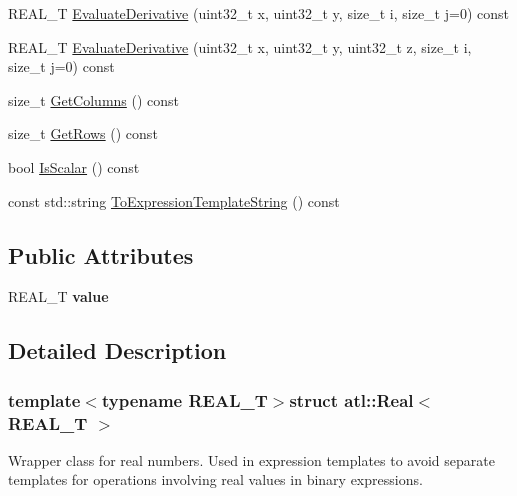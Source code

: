 \begin{DoxyCompactItemize}
\item 
R\+E\+A\+L\+\_\+\+T \hyperlink{structatl_1_1_real_a38575ddce1aa16e993c3739cef91eb85}{Evaluate\+Derivative} (uint32\+\_\+t x, uint32\+\_\+t y, size\+\_\+t i, size\+\_\+t j=0) const 
\item 
R\+E\+A\+L\+\_\+\+T \hyperlink{structatl_1_1_real_a9af356095d17f7173d85d8850159ecdc}{Evaluate\+Derivative} (uint32\+\_\+t x, uint32\+\_\+t y, uint32\+\_\+t z, size\+\_\+t i, size\+\_\+t j=0) const 
\item 
size\+\_\+t \hyperlink{structatl_1_1_real_af08c2cd5341fa39e461c13251191081c}{Get\+Columns} () const 
\item 
size\+\_\+t \hyperlink{structatl_1_1_real_a70d87c955e5b4566387b614ee6e81b6e}{Get\+Rows} () const 
\item 
bool \hyperlink{structatl_1_1_real_afa844d891d764e1ac8d0e78cccb78615}{Is\+Scalar} () const 
\item 
const std\+::string \hyperlink{structatl_1_1_real_a49866acc5c3a74eb4b57da139d702901}{To\+Expression\+Template\+String} () const 
\end{DoxyCompactItemize}
\subsection*{Public Attributes}
\begin{DoxyCompactItemize}
\item 
\hypertarget{structatl_1_1_real_a4de36acb39ddc2a51f5bf72421240152}{R\+E\+A\+L\+\_\+\+T {\bfseries value}}\label{structatl_1_1_real_a4de36acb39ddc2a51f5bf72421240152}

\end{DoxyCompactItemize}


\subsection{Detailed Description}
\subsubsection*{template$<$typename R\+E\+A\+L\+\_\+\+T$>$struct atl\+::\+Real$<$ R\+E\+A\+L\+\_\+\+T $>$}

Wrapper class for real numbers. Used in expression templates to avoid separate templates for operations involving real values in binary expressions. 

